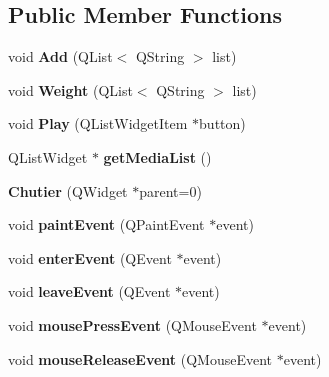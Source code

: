 \subsection*{\-Public \-Member \-Functions}
\begin{DoxyCompactItemize}
\item 
\hypertarget{class_chutier_af9218a9aa819faaa5f41e12982d23e83}{void {\bfseries \-Add} (\-Q\-List$<$ \-Q\-String $>$ list)}\label{class_chutier_af9218a9aa819faaa5f41e12982d23e83}

\item 
\hypertarget{class_chutier_a90170902ce9da77c051b61d1a5265392}{void {\bfseries \-Weight} (\-Q\-List$<$ \-Q\-String $>$ list)}\label{class_chutier_a90170902ce9da77c051b61d1a5265392}

\item 
\hypertarget{class_chutier_a743abbae7b6e2029debeb82a62bbcd0c}{void {\bfseries \-Play} (\-Q\-List\-Widget\-Item $\ast$button)}\label{class_chutier_a743abbae7b6e2029debeb82a62bbcd0c}

\item 
\hypertarget{class_chutier_a128a5d0cdfa7c28b236e41219433a94a}{\-Q\-List\-Widget $\ast$ {\bfseries get\-Media\-List} ()}\label{class_chutier_a128a5d0cdfa7c28b236e41219433a94a}

\item 
\hypertarget{class_chutier_a703afe4f6ec72bf3ca37e15cbfc44fb7}{{\bfseries \-Chutier} (\-Q\-Widget $\ast$parent=0)}\label{class_chutier_a703afe4f6ec72bf3ca37e15cbfc44fb7}

\item 
\hypertarget{class_chutier_a637112277c752f7b207cac4bc226df4c}{void {\bfseries paint\-Event} (\-Q\-Paint\-Event $\ast$event)}\label{class_chutier_a637112277c752f7b207cac4bc226df4c}

\item 
\hypertarget{class_chutier_a6bf1c8e7fdd33d15a5eabf275f684bd9}{void {\bfseries enter\-Event} (\-Q\-Event $\ast$event)}\label{class_chutier_a6bf1c8e7fdd33d15a5eabf275f684bd9}

\item 
\hypertarget{class_chutier_ae27e4bb88c0b8be2e808d0a36fdf94cb}{void {\bfseries leave\-Event} (\-Q\-Event $\ast$event)}\label{class_chutier_ae27e4bb88c0b8be2e808d0a36fdf94cb}

\item 
\hypertarget{class_chutier_a71efe3e6fbfbac809e9cad405f626981}{void {\bfseries mouse\-Press\-Event} (\-Q\-Mouse\-Event $\ast$event)}\label{class_chutier_a71efe3e6fbfbac809e9cad405f626981}

\item 
\hypertarget{class_chutier_ac072c22b3e0f270258ba710815e07cd0}{void {\bfseries mouse\-Release\-Event} (\-Q\-Mouse\-Event $\ast$event)}\label{class_chutier_ac072c22b3e0f270258ba710815e07cd0}

\end{DoxyCompactItemize}
